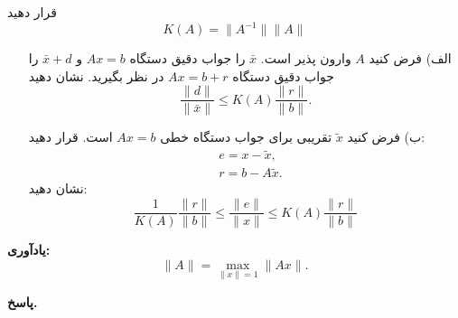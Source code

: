 قرار دهید
\[K(A) = \|A^{-1}\|\|A\|\]
\begin{enumerate}
	\item[الف)] فرض کنید 
	\(A\)
	وارون پذیر است. 
	\(\bar{x}\)
	را جواب دقیق دستگاه 
	\(Ax = b\)
	و
	\(\bar{x} +d\)
	را جواب دقیق  دستگاه 
	\(Ax = b + r\)
	 در نظر بگیرید. نشان دهید
	\[\frac{\|d\|}{\|\bar{x}\|} \leq K(A) \frac{\|r\|}{\|b\|}.  \]
	\vspace*{.3cm}
	\item[ب)] 
	فرض کنید 
	\(\tilde{x}\)
	تقریبی برای جواب دستگاه خطی
	\(Ax = b\)
	است. قرار دهید:
	\begin{align*}
		& e = x - \tilde{x},\\
		& r= b -A\tilde{x}.
	\end{align*}
	نشان دهید:
	\[
	\frac{1}{K(A)} \frac{\|r\|}{\|b\|} \leq \frac{\|e\|}{\|x\|} \leq  K(A) \frac{\|r\|}{\|b\|}
	\]
		\vspace*{.3cm}
	
\end{enumerate}
\textbf{یادآوری:}
\[\|A\| = \max_{\|x\|=1} \|Ax\|.\]

\begin{answer}
	
	\textbf{پاسخ.}
	
\end{answer}